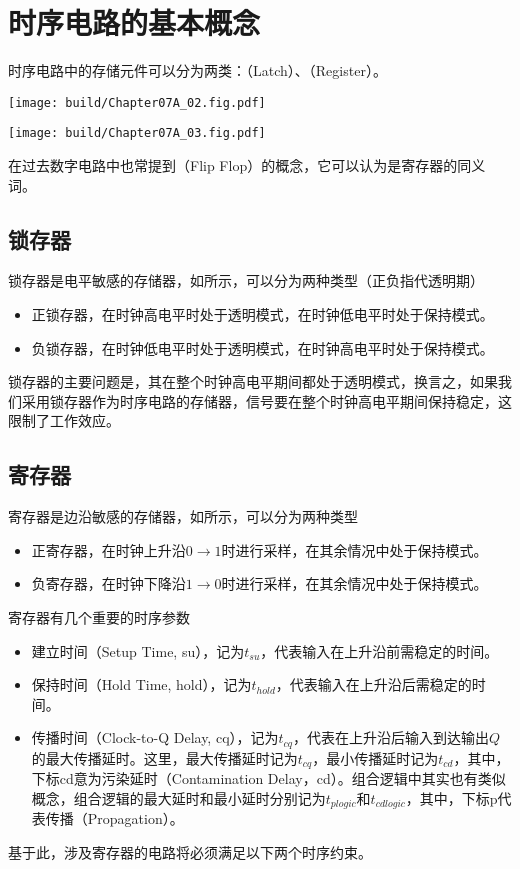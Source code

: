 \section{时序电路的基本概念}

时序电路中的存储元件可以分为两类：（Latch）、（Register）。
\begin{Figure}[两类存储元件]
    \begin{FigureSub}[锁存器]
        \texttt{[image: build/Chapter07A\_02.fig.pdf]}
    \end{FigureSub}
    \hspace{1cm}
    \begin{FigureSub}[寄存器]
        \texttt{[image: build/Chapter07A\_03.fig.pdf]}
    \end{FigureSub}
\end{Figure}
在过去数字电路中也常提到（Flip Flop）的概念，它可以认为是寄存器的同义词。

\subsection{锁存器}
锁存器是电平敏感的存储器，如所示，可以分为两种类型（正负指代透明期）
\begin{itemize}
    \item 正锁存器，在时钟高电平时处于透明模式，在时钟低电平时处于保持模式。
    \item 负锁存器，在时钟低电平时处于透明模式，在时钟高电平时处于保持模式。
\end{itemize}
锁存器的主要问题是，其在整个时钟高电平期间都处于透明模式，换言之，如果我们采用锁存器作为时序电路的存储器，信号要在整个时钟高电平期间保持稳定，这限制了工作效应。

\subsection{寄存器}
寄存器是边沿敏感的存储器，如所示，可以分为两种类型
\begin{itemize}
    \item 正寄存器，在时钟上升沿$0\to 1$时进行采样，在其余情况中处于保持模式。
    \item 负寄存器，在时钟下降沿$1\to 0$时进行采样，在其余情况中处于保持模式。
\end{itemize}
寄存器有几个重要的时序参数
\begin{itemize}
    \item 建立时间（Setup Time, su），记为$t_{su}$，代表输入在上升沿前需稳定的时间。
    \item 保持时间（Hold Time, hold），记为$t_{hold}$，代表输入在上升沿后需稳定的时间。
    \item 传播时间（Clock-to-Q Delay, cq），记为$t_{cq}$，代表在上升沿后输入到达输出$Q$的最大传播延时。这里，最大传播延时记为$t_{cq}$，最小传播延时记为$t_{cd}$，其中，下标cd意为污染延时（Contamination Delay，cd）。组合逻辑中其实也有类似概念，组合逻辑的最大延时和最小延时分别记为$t_{plogic}$和$t_{cdlogic}$，其中，下标p代表传播（Propagation）。
\end{itemize}
基于此，涉及寄存器的电路将必须满足以下两个时序约束。


